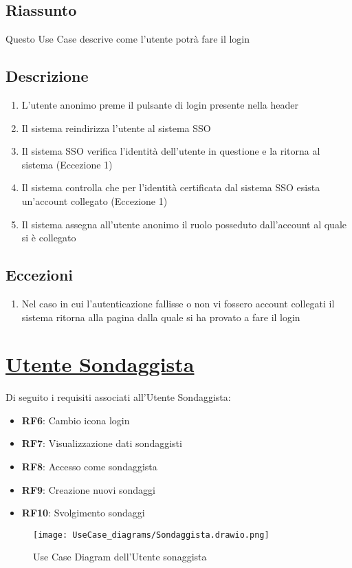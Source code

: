         \subsection{Riassunto}
            Questo Use Case descrive come l'utente potrà fare il login
        \subsection{Descrizione}
            \begin{enumerate}
                \item L'utente anonimo preme il pulsante di login presente nella header
                \item Il sistema reindirizza l'utente al sistema SSO
                \item Il sistema SSO verifica l'identità dell'utente in questione e la ritorna al sistema (Eccezione 1)
                \item Il sistema controlla che per l'identità certificata dal sistema SSO esista un'account collegato (Eccezione 1)
                \item Il sistema assegna all'utente anonimo il ruolo posseduto dall'account al quale si è collegato
            \end{enumerate}
        \subsection{Eccezioni}
            \begin{enumerate}
                \item Nel caso in cui l'autenticazione fallisse o non vi fossero account collegati il sistema ritorna alla pagina dalla quale si ha provato a fare il login
            \end{enumerate}

\section{\underline{Utente Sondaggista}}
    Di seguito i requisiti associati all'Utente Sondaggista:
    \begin{itemize}
        \item \textbf{RF6}: Cambio icona login
        \item \textbf{RF7}: Visualizzazione dati sondaggisti
        \item \textbf{RF8}: Accesso come sondaggista
        \item \textbf{RF9}: Creazione nuovi sondaggi
        \item \textbf{RF10}: Svolgimento sondaggi
    \end{itemize}
    \begin{figure}[H]
        \centering
        \texttt{[image: UseCase\_diagrams/Sondaggista.drawio.png]}
        \caption{Use Case Diagram dell'Utente sonaggista}
    \end{figure}